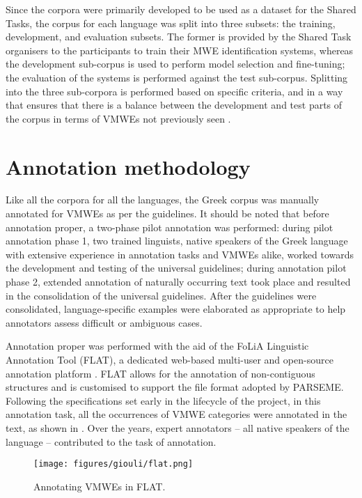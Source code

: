 \documentclass[output=paper,colorlinks,citecolor=brown]{langscibook}
\begin{document}
Since the corpora were primarily developed to be used as a dataset for the Shared Tasks, the corpus for each language was split into three subsets: the training, development, and evaluation subsets. The former is provided by the Shared Task organisers to the participants to train their MWE identification systems, whereas the development sub-corpus is used to perform model selection and fine-tuning; the evaluation of the systems is performed against the test sub-corpus. Splitting into the three sub-corpora is performed based on specific criteria, and in a way that ensures that there is a balance between the development and test parts of the corpus in terms of VMWEs not previously seen \citep{ramisch_etal_2020, savary-etal-2023-parseme}.


\section{Annotation methodology}
\label{sec:methodology}
Like all the corpora for all the languages, the Greek corpus was manually annotated for VMWEs as per the guidelines. It should be noted that before annotation proper, a two-phase pilot annotation was performed: during pilot annotation phase 1, two trained linguists, native speakers of the Greek language with extensive experience in annotation tasks and VMWEs alike, worked towards the development and testing of the universal guidelines; during annotation pilot phase 2, extended annotation of naturally occurring text took place and resulted in the consolidation of the universal guidelines. After the guidelines were consolidated, language-specific examples were elaborated as appropriate to help annotators assess difficult or ambiguous cases.

Annotation proper was performed with the aid of the FoLiA Linguistic Annotation Tool (FLAT), a dedicated web-based multi-user and open-source annotation platform \citep{vanGompel_Reynaert_2013}. FLAT allows for the annotation of non-contiguous structures and is customised to support the file format adopted by PARSEME. Following the specifications set early in the lifecycle of the project, in this annotation task, all the occurrences of VMWE categories were annotated in the text, as shown in .
Over the years, expert annotators -- all native speakers of the language -- contributed to the task of annotation.

\begin{figure}
    \centering
    \texttt{[image: figures/giouli/flat.png]}
    \caption{Annotating VMWEs in FLAT.}
    \label{fig:flat}
\end{figure}
\end{document}

